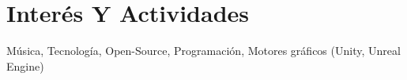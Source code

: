 \documentclass[a4paper,10pt]{article} %
\begin{document}

\section{Inter\'es Y Actividades}

M\'usica, Tecnolog\'ia, Open-Source, Programaci\'on, Motores gr\'aficos (Unity, Unreal Engine)\\

\end{document}
